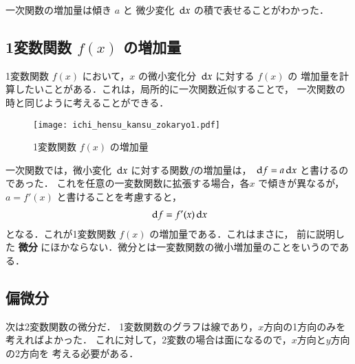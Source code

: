                                 一次関数の増加量は傾き $a$ と 微少変化 $\,\mathrm{d} x$ の積で表せることがわかった．

            \subsection{1変数関数 $f(x)$ の増加量}
                1変数関数 $f(x)$ において，$x$ の微小変化分 $\,\mathrm{d} x$ に対する $f(x)$ の
                増加量を計算したいことがある．これは，局所的に一次関数近似することで，
                一次関数の時と同じように考えることができる．
                \begin{figure}[hbt]
                    \begin{center}
                        \texttt{[image: ichi\_hensu\_kansu\_zokaryo1.pdf]}
                        \caption{1変数関数 $f(x)$ の増加量}
                        \label{fig:ichi_hensu_kansu_zokaryo1}
                    \end{center}
                \end{figure}

                                一次関数では，微小変化 $\,\mathrm{d} x$ に対する関数$f$の増加量は，
                                $\,\mathrm{d} f= a\,\mathrm{d} x$ と書けるのであった．
                                これを任意の一変数関数に拡張する場合，各$x$ で傾きが異なるが，$a=f'(x)$ と書けることを考慮すると，
                                        \begin{align}
                                                \,\mathrm{d} f = f'(x) \,\mathrm{d} x
                                        \end{align}
                                となる．これが1変数関数 $f(x)$ の増加量である．これはまさに，
                                前に説明した \textbf{微分} にほかならない．微分とは一変数関数の微小増加量のことをいうのである．

            \subsection{偏微分}
                次は2変数関数の微分だ．
                1変数関数のグラフは線であり，$x$方向の1方向のみを考えればよかった．
                これに対して，2変数の場合は面になるので，$x$方向と$y$方向の2方向を
                考える必要がある．

